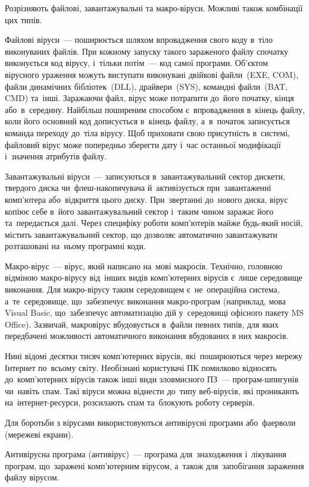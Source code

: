 \documentclass[
	a4paper,
	oneside,
	DIV = 12,
	fontsize = 13pt,
	headings = normal,
]{scrartcl}
\begin{document}
		Розрізняють файлові, завантажувальні та макро-віруси. Можливі також комбінації цих типів. 

		Файлові віруси~— поширюється шляхом впровадження свого коду в~тіло виконуваних файлів. При кожному запуску такого зараженого файлу спочатку виконується код вірусу, і~тільки потім~— код самої програми. Об'єктом вірусного ураження можуть виступати виконувані двійкові файли~(EXE, COM), файли динамічних бібліотек~(DLL), драйвери~(SYS), командні файли~(BAT, CMD) та~інші. Заражаючи файл, вірус може потрапити до~його початку, кінця або~в~середину. Найбільш поширеним способом є~впровадження в~кінець файлу, коли його основний код дописується в~кінець файлу, а~в~початок записується команда переходу до~тіла вірусу. Щоб приховати свою присутність в~системі, файловий вірус може попередньо зберегти дату і~час останньої модифікації і~значення атрибутів файлу.

		Завантажувальні віруси~— записуються в~завантажувальний сектор дискети, твердого диска чи~флеш-накопичувача й~активізується при~завантаженні комп'ютера або~відкриття цього диску. При~звертанні до~нового диска, вірус копіює себе в~його завантажувальний сектор і~таким чином заражає його та~передається далі. Через специфіку роботи комп'ютерів майже будь-який носій, містить завантажувальний сектор, що дозволяє автоматично завантажувати розташовані на~ньому програмні коди. 

		Макро-вірус~— вірус, який написано на~мові макросів. Технічно, головною відміною макро-вірусу від~інших видів комп'ютерних вірусів є~лише середовище виконання. Для макро-вірусу таким середовищем є~не~операційна система, а~те~середовище, що~забезпечує виконання макро-програм (наприклад, мова \textenglish{Visual Basic}, що~забезпечує автоматизацію дій у~середовищі офісного пакету \textenglish{MS Office}). Зазвичай, макровірус вбудовується в~файли певних типів, для яких передбачені можливості автоматичного виконання  вбудованих в них макросів. 

		Нині відомі десятки тисяч комп'ютерних вірусів, які~поширюються через мережу Інтернет по~всьому світу. Необізнані користувачі ПК помилково відносять до~комп'\-ютерних вірусів також інші види зловмисного ПЗ~— програм-шпигунів чи~навіть спам. Такі віруси можна віднести до~типу веб-вірусів, які проникають на~інтернет-ресурси, розсилають спам та~блокують роботу серверів.

		Для боротьби з вірусами використовуються антивірусні програми або~фаерволи (мережеві екрани).

		Антивірусна програма (антивірус)~— програма для~знаходження і~лікування програм, що~заражені комп'ютерним вірусом, а~також для~запобігання зараження файлу вірусом. 
\end{document}
